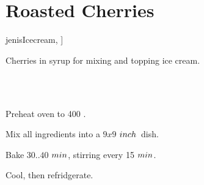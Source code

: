 \section{Roasted Cherries}

\begin{recipestats}[
        servings=1~\onefourth~C,
        bakingtime=30~\minute,
        inactivetime=1~\hour,
        original=\citetitle{jenisIcecream}~\cite[p.~196]{jenisIcecream},
    ]
\end{recipestats}

\begin{recipeabstract}
    Cherries in syrup for mixing and topping ice cream.
\end{recipeabstract}

\begin{ingredientcolumns}[1]
    \begin{ingredientblock}
        \\
        \\
    \end{ingredientblock}
\end{ingredientcolumns}

\begin{preparation}
\item Preheat oven to 400 \Fahrenheit.
\item Mix all ingredients into a $9x9$ $\inch$~dish.
\item Bake $30 .. 40$ $\minute$, stirring every 15 $\minute$.
\item Cool, then refridgerate.
\end{preparation}

\recipeend%
